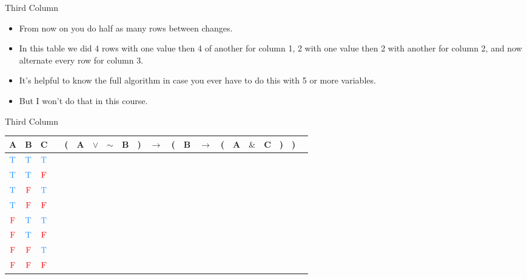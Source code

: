 \documentclass[
  ignorenonframetext,
]{beamer}
\providecommand{\tightlist}{%
  \setlength{\itemsep}{0pt}\setlength{\parskip}{0pt}}
\renewcommand{\,}{\text{, }}
\def\True{\textcolor{dodgerblue}{\text{T}}}
\def\False{\textcolor{red}{\text{F}}}
\begin{document}
\begin{frame}{Third Column}
\protect\hypertarget{third-column}{}

\begin{itemize}
\tightlist
\item
  From now on you do half as many rows between changes.
\item
  In this table we did 4 rows with one value then 4 of another for
  column 1, 2 with one value then 2 with another for column 2, and now
  alternate every row for column 3.
\item
  It's helpful to know the full algorithm in case you ever have to do
  this with 5 or more variables.
\item
  But I won't do that in this course.
\end{itemize}

\end{frame}

\begin{frame}{Third Column}
\protect\hypertarget{third-column-1}{}

\begin{center}
\begin{tabular}{@{ }c@{ }@{ }c@{ }@{ }c | c@{ }@{}c@{}@{ }c@{ }@{ }c@{ }@{ }c@{ }@{ }c@{ }@{}c@{}@{ }c@{ }@{}c@{}@{ }c@{ }@{ }c@{ }@{}c@{}@{ }c@{ }@{ }c@{ }@{ }c@{ }@{}c@{}@{}c@{}@{ }c}
A & B & C &  & ( & A & $\lor$ & $\sim$ & B & ) & $\rightarrow$ & ( & B & $\rightarrow$ & ( & A & $\&$ & C & ) & ) & \\
\hline 
 $\True$ & $\True$ & $\True$ &  & \\
 $\True$ & $\True$ & $\False$ &  & \\
 $\True$ & $\False$ & $\True$ &  & \\
 $\True$ & $\False$ & $\False$ &  &  \\
 $\False$ & $\True$ & $\True$ &  & \\
 $\False$ & $\True$ & $\False$ &  & \\
 $\False$ & $\False$ & $\True$ &  & \\
 $\False$ & $\False$ & $\False$ &  & \\
\end{tabular}
\end{center}

\end{frame}
\end{document}
